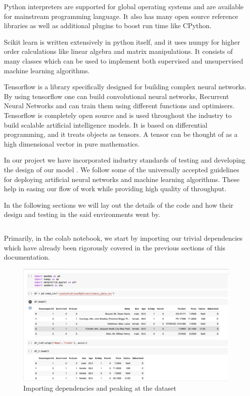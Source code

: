 \documentclass[12pt]{article}
\newcommand{\nd}{\noindent}
\newcommand{\subsize}{\fontsize{14pt}{12pt}\selectfont}
\begin{document}
\nd Python interpreters are supported for global operating systems and are available for mainstream programming language. It also has many open source reference libraries as well as additional plugins to boost run time like CPython. 

\nd Scikit learn is written extensively in python itself, and it uses numpy for higher order calculations like linear algebra and matrix manipulations. It consists of many classes which can be used to implement both supervised and unsupervised machine learning algorithms. 

\nd Tensorflow is a library specifically designed for building complex neural networks. By using tensorflow one can build convolutional neural networks, Recurrent Neural Networks and can train them using different functions and optimisers. Tensorflow is completely open source and is used throughout the industry to build scalable artificial intelligence models. It is based on differential programming, and it treats objects as tensors. A tensor can be thought of as a high dimensional vector in pure mathematics. 

\nd In our project we have incorporated industry standards of testing and developing the design of our model . We follow some of the universally accepted guidelines for deploying artificial neural networks and machine learning algorithms. These help in easing our flow of work while providing high quality of throughput.

\nd In the following sections we will lay out the details of the code and how their design and testing in the said environments went by. 

\newpage
\subsection{\textbf{\subsize{CODE}}}
Primarily, in the colab notebook, we start by importing our trivial dependencies which have already been rigorously covered in the previous sections of this documentation. 

\begin{center}
\begin{figure}[h]
\centerline{\includegraphics[scale=.35]{part1.png}}
\caption{Importing dependencies and peaking at the dataset}
\end{figure}
\end{center}
 
\end{document}
